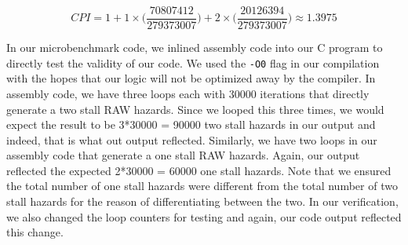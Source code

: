 \documentclass[12pt]{article}
\begin{document}
\begin{singlespace}
$$
CPI = 1+1\times\Big(\frac{70807412}{279373007}\Big)+2\times\Big(\frac{20126394}{279373007}\Big)
    \approx 1.3975
$$

In our microbenchmark code, we inlined assembly code into our C program to directly test the validity of our code. We used the \texttt{-O0} flag in our compilation with the hopes that our logic will not be optimized away by the compiler. In assembly code, we have three loops each with 30000 iterations that directly generate a two stall RAW hazards. Since we looped this three times, we would expect the result to be 3*30000 = 90000 two stall hazards in our output and indeed, that is what out output reflected. Similarly, we have two loops in our assembly code that generate a one stall RAW hazards. Again, our output reflected the expected 2*30000 = 60000 one stall hazards. Note that we ensured the total number of one stall hazards were different from the total number of two stall hazards for the reason of differentiating between the two. In our verification, we also changed the loop counters for testing and again, our code output reflected this change.

\end{singlespace}
\end{document}
